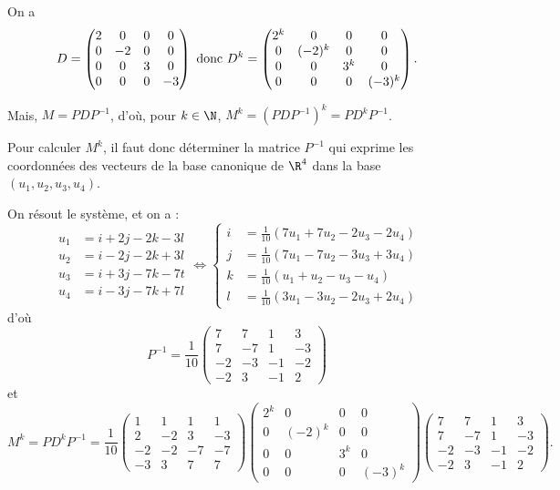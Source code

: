 {\begin{enumerate}
{On a $$D=\begin{pmatrix}2&0&0&0 \\  0&-2&0&0 \\  0&0&3&0 \\  0&0&0&-3\end{pmatrix}\ {\hbox{donc}}\ 
D^k=\begin{pmatrix}2^k&0&0&0 \\  0&(-2)^k&0&0 \\  0&0&3^k&0 \\  0&0&0&(-3)^k\end{pmatrix}.$$

Mais, $M=PDP^{-1}$, d'o\`u, pour $k\in\N$, $M^k=(PDP^{-1})^k=PD^kP^{-1}$. 

Pour calculer $M^k$, il faut donc d\'eterminer la matrice $P^{-1}$ qui exprime les coordonn\'ees des vecteurs de la base canonique de $\R^4$ dans la base $(u_1,u_2,u_3,u_4)$.

On r\'esout le syst\`eme, et on a :
$$\begin{aligned}u_1&=i+2j-2k-3l \\  u_2&=i-2j-2k+3l \\  u_3&=i+3j-7k-7t \\  u_4&=i-3j-7k+7l\end{aligned}\iff
\left\{\begin{aligned}i&={\frac{1}{10}}(7u_1+7u_2-2u_3-2u_4) \\  
j&={\frac{1}{10}}(7u_1-7u_2-3u_3+3u_4) \\  
k&={\frac{1}{10}}(u_1+u_2-u_3-u_4) \\  
l&={\frac{1}{10}}(3u_1-3u_2-2u_3+2u_4)\end{aligned}\right.$$
d'o\`u
$$P^{-1}={\frac{1}{10}}\begin{pmatrix}7&7&1&3 \\  7&-7&1&-3 \\  -2&-3&-1&-2 \\  -2&3&-1&2\end{pmatrix}$$
et 
$$M^k=PD^kP^{-1}={\frac{1}{10}}\begin{pmatrix}1&1&1&1 \\  2&-2&3&-3 \\  -2&-2&-7&-7 \\  -3&3&7&7\end{pmatrix}
\begin{pmatrix}2^k&0&0&0 \\  0&(-2)^k&0&0 \\  0&0&3^k&0 \\  0&0&0&(-3)^k\end{pmatrix}
\begin{pmatrix}7&7&1&3 \\  7&-7&1&-3 \\  -2&-3&-1&-2 \\  -2&3&-1&2\end{pmatrix}.$$}
\end{enumerate}
}
